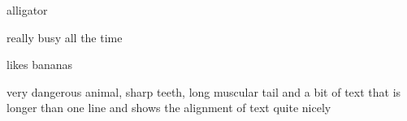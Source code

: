 \begin{labeling}{alligator}
\item [\textbf{ant}] really busy all the time
  \item [chimp] likes bananas
  \item [alligator] very dangerous animal, sharp teeth, long
muscular tail and a bit of text that is longer than one
line and shows the alignment of text quite nicely
\end{labeling}
